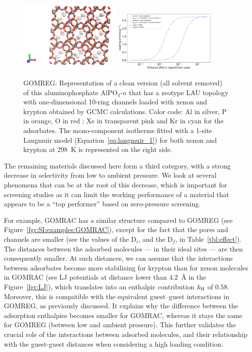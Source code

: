\documentclass[main.tex]{subfiles}
\begin{document}
\begin{figure}[h]
  \centering
    \includegraphics[width=0.45\textwidth]{figures/2-thermo/GOMREG_clean.jpg}
    \includegraphics[width=0.45\textwidth]{figures/2-thermo/GOMREG_clean_isotherm_xenon_krypton_298K.jpg}
    \caption{GOMREG: Representation of a clean version (all solvent removed) of this aluminophosphate AlPO$_4$-$n$ that has a zeotype LAU topology with one-dimensional 10-ring channels loaded with xenon and krypton obtained by GCMC calculations. Color code: Al in silver, P in orange, O in red ; Xe in transparent pink and Kr in cyan for the adsorbates. The mono-component isotherms fitted with a 1-site Langmuir model (Equation~\ref{eq:langmuir_1}) for both xenon and krypton at \SI{298}{\kelvin} is represented on the right side.}\label{fgr:SI:examples:GOMREG}
  \end{figure}

The remaining materials discussed here form a third category, with a strong decrease in selectivity from low to ambient pressure. We look at several phenomena that can be at the root of this decrease, which is important for screening studies as it can limit the working performance of a material that appears to be a ``top performer'' based on zero-pressure screening.


For example, GOMRAC has a similar structure compared to GOMREG (see Figure~\ref{fgr:SI:examples:GOMRAC}), except for the fact that the pores and channels are smaller (see the values of the D$_i$, and the D$_f$, in Table~\ref{tbl:effect}). The distances between the adsorbed molecules --- in their ideal sites --- are then consequently smaller. At such distances, we can assume that the interactions between adsorbates become more stabilizing for krypton than for xenon molecules in GOMRAC (see LJ potentials at distance lower than \SI{4.2}{\angstrom} in the Figure~\ref{fgr:LJ}), which translates into an enthalpic contribution $k_{\text{H}}$ of $0.58$. Moreover, this is compatible with the equivalent guest--guest interactions in GOMREG, as previously discussed. It explains why the difference between the adsorption enthalpies becomes smaller for GOMRAC, whereas it stays the same for GOMREG (between low and ambient pressure). This further validates the crucial role of the interactions between adsorbed molecules, and their relationship with the guest-guest distances when considering a high loading condition.
\end{document}
